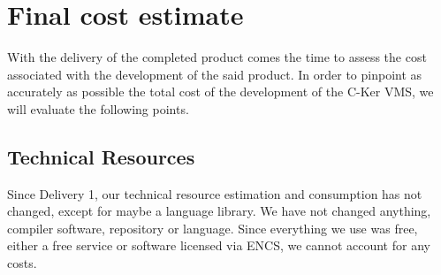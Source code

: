 \documentclass[12pt]{article}
\begin{document}

\section{Final cost estimate}


With the delivery of the completed product comes the time to assess the cost associated with the development of the said product.  In order to pinpoint as accurately as possible the total cost of the development of the C-Ker VMS, we will evaluate the following points.

\clearpage
\subsection{Technical Resources}
    Since Delivery 1, our technical resource estimation and consumption has not changed, except for maybe a language library.  We have not changed anything, compiler software, repository or language. Since everything we use was free, either a free service or software licensed via ENCS, we cannot account for any costs. 
\end{document}
